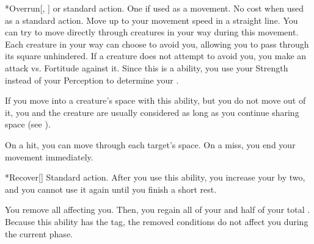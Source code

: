         \begin{activeability}*{Overrun}[, ]
            \abilityusagetime {} or standard action.
            \abilitycost One  if used as a movement. No cost when used as a standard action.
            \rankline
            Move up to your movement speed in a straight line.
            You can try to move directly through creatures in your way during this movement.
            Each creature in your way can choose to avoid you, allowing you to pass through its square unhindered.
            If a creature does not attempt to avoid you, you make an attack vs. Fortitude against it.
            Since this is a  ability, you use your Strength instead of your Perception to determine your .

            If you move into a creature's space with this ability, but you do not move out of it, you and the creature are usually considered \squeezing as long as you continue sharing space (see ).

            On a hit, you can move through each target's space.
            On a miss, you end your movement immediately.
        \end{activeability}

        \begin{activeability}*{Recover}[]
            \abilityusagetime Standard action.
            \rankline
            After you use this ability, you increase your  by two, and you cannot use it again until you finish a short rest.

            You remove all  affecting you.
            Then, you regain all of your  and half of your total .
            Because this ability has the  tag, the removed conditions do not affect you during the current phase.
        \end{activeability}

